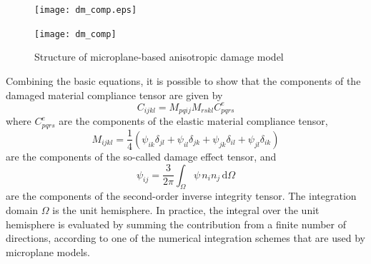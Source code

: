\documentclass[a4paper]{article}
\newcommand{\dO}{\,\mbox{d}\Omega}
\newcommand{\quarter}{\mbox{$\frac{1}{4}$}}
\begin{document}
\begin{figure}[!htb]
\begin{htmlonly}
  \centerline{\texttt{[image: dm\_comp.eps]}}
\end{htmlonly}
 \centerline{\texttt{[image: dm\_comp]}}
\caption{Structure of microplane-based anisotropic damage model}
\label{ff4}
\end{figure}

Combining the basic equations, it is possible to show that the
components of the damaged
material compliance tensor are given by
\begin{equation}
\label{damcom}
C_{ijkl}=M_{pqij}M_{rskl}C^e_{pqrs}
\end{equation}
where $C^e_{pqrs}$ are the components of the elastic material compliance tensor,
\begin{equation}
\label{ee27}
M_{ijkl} = \quarter\left(
\psi_{ik}\delta_{jl}+\psi_{il}\delta_{jk}+\psi_{jk}\delta_{il}+\psi_{jl}\delta_{ik}\right)
\end{equation}
are the components of the so-called damage effect tensor, and
\begin{equation}
\label{ee24}
\psi_{ij} = \frac{3}{2\pi}\int_\Omega \psi\, n_i n_j \dO
\end{equation}
are the components of the second-order inverse integrity tensor.
The integration domain $\Omega$ is the unit hemisphere.
In practice, the integral over the unit hemisphere is evaluated by
summing the contribution from a finite number of directions, according
to one of the numerical integration schemes that are used by microplane
models.
\end{document}
